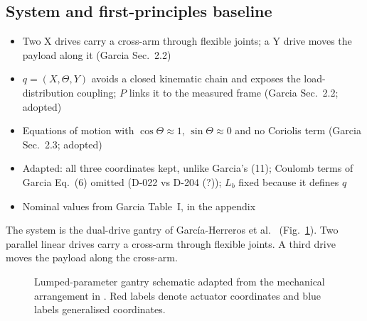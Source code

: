 \subsection{System and first-principles baseline}\label{sec:system}
\ifdraft
\begin{itemize}
\item Two X drives carry a cross-arm through flexible joints; a Y drive moves the payload along it (Garcia Sec.~2.2)
\item $q=(X,\Theta,Y)$ avoids a closed kinematic chain and exposes the load-distribution coupling; $P$ links it to the measured frame (Garcia Sec.~2.2; adopted)
\item Equations of motion with $\cos\Theta\approx1$, $\sin\Theta\approx0$ and no Coriolis term (Garcia Sec.~2.3; adopted)
\item Adapted: all three coordinates kept, unlike Garcia's (11); Coulomb terms of Garcia Eq.~(6) omitted (D-022 vs D-204 (?)); $L_b$ fixed because it defines $q$
\item Nominal values from Garcia Table~I, in the appendix
\end{itemize}
\fi
The system is the dual-drive gantry of Garc\'ia-Herreros et
al.~\cite{garcia2013model} (Fig.~\ref{fig:gantry_system}).
Two parallel linear drives carry a cross-arm through flexible joints.
A third drive moves the payload along the cross-arm.
\begin{figure}[b]
  \centering
  \def\gantryabsorber{0}%
  
  \caption{Lumped-parameter gantry schematic adapted from the mechanical
  arrangement in \cite{garcia2013model}. Red labels denote actuator coordinates
  and blue labels generalised coordinates.}
  \label{fig:gantry_system}
\end{figure}

